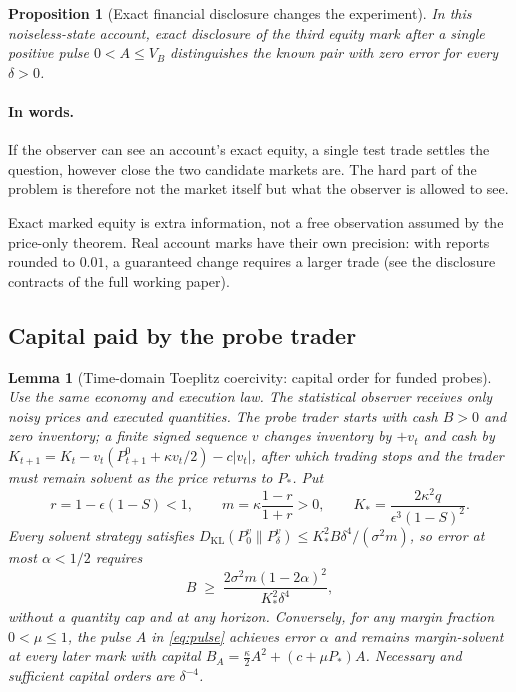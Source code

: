 \documentclass[12pt]{article}
\newtheorem{proposition}[theorem]{Proposition}
\newtheorem{lemma}[theorem]{Lemma}
\theoremstyle{definition}
\theoremstyle{remark}
\newcommand{\KL}{D_{\mathrm{KL}}}
\begin{document}
\begin{proposition}[Exact financial disclosure changes the experiment]\label{prop:disclosure}
In this noiseless-state account, exact disclosure of the third equity mark after a single positive pulse $0<A\le V_B$ distinguishes the known pair with zero error for every $\delta>0$.
\end{proposition}

\paragraph{In words.} If the observer can see an account's exact equity, a single test trade settles the question, however close the two candidate markets are. The hard part of the problem is therefore not the market itself but what the observer is allowed to see.

Exact marked equity is extra information, not a free observation assumed by the price-only theorem. Real account marks have their own precision: with reports rounded to $0.01$, a guaranteed change requires a larger trade (see the disclosure contracts of the full working paper).

\subsection{Capital paid by the probe trader}

\begin{lemma}[Time-domain Toeplitz coercivity: capital order for funded probes]\label{thm:capital}
Use the same economy and execution law. The statistical observer receives only noisy prices and executed quantities. The probe trader starts with cash $B>0$ and zero inventory; a finite signed sequence $v$ changes inventory by $+v_t$ and cash by $K_{t+1}=K_t-v_t(P^0_{t+1}+\kappa v_t/2)-c|v_t|$, after which trading stops and the trader must remain solvent as the price returns to $P_*$. Put
\[
r=1-\epsilon(1-S)<1,\qquad m=\kappa\frac{1-r}{1+r}>0,\qquad K_*=\frac{2\kappa^2q}{\epsilon^3(1-S)^2}.
\]
Every solvent strategy satisfies $\KL(P_0^v\|P_\delta^v)\le K_*^2B\delta^4/(\sigma^2m)$, so error at most $\alpha<1/2$ requires
\begin{equation}\label{eq:Bmin}
B\;\ge\;\frac{2\sigma^2m(1-2\alpha)^2}{K_*^2\delta^4},
\end{equation}
without a quantity cap and at any horizon. Conversely, for any margin fraction $0<\mu\le1$, the pulse $A$ in \eqref{eq:pulse} achieves error $\alpha$ and remains margin-solvent at every later mark with capital $B_A=\tfrac{\kappa}{2}A^2+(c+\mu P_*)A$. Necessary and sufficient capital orders are $\delta^{-4}$.
\end{lemma}
\end{document}
